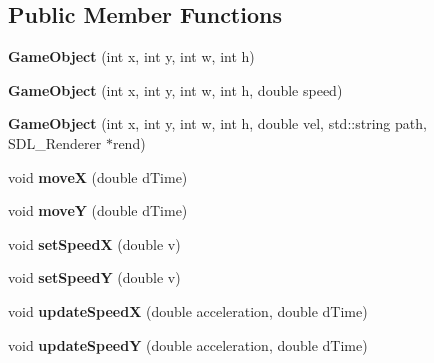\subsection*{Public Member Functions}
\begin{DoxyCompactItemize}
\item 
\hypertarget{class_game_object_ad5223d5e6c6bc39529c85dceb1d50930}{}{\bfseries Game\+Object} (int x, int y, int w, int h)\label{class_game_object_ad5223d5e6c6bc39529c85dceb1d50930}

\item 
\hypertarget{class_game_object_a3a91505bf2480eab8333df4c9c6b5a7e}{}{\bfseries Game\+Object} (int x, int y, int w, int h, double speed)\label{class_game_object_a3a91505bf2480eab8333df4c9c6b5a7e}

\item 
\hypertarget{class_game_object_a36a5f15c226732b4ecea0cd01d6c0c37}{}{\bfseries Game\+Object} (int x, int y, int w, int h, double vel, std\+::string path, S\+D\+L\+\_\+\+Renderer $\ast$rend)\label{class_game_object_a36a5f15c226732b4ecea0cd01d6c0c37}

\item 
\hypertarget{class_game_object_a508ffb146e68ae0699c16e7e0be395cf}{}void {\bfseries move\+X} (double d\+Time)\label{class_game_object_a508ffb146e68ae0699c16e7e0be395cf}

\item 
\hypertarget{class_game_object_a8c98efc0e75c4df16d6d065dbf119f4a}{}void {\bfseries move\+Y} (double d\+Time)\label{class_game_object_a8c98efc0e75c4df16d6d065dbf119f4a}

\item 
\hypertarget{class_game_object_a29a1e18b85acfbdccca5388b6b11d6e6}{}void {\bfseries set\+Speed\+X} (double v)\label{class_game_object_a29a1e18b85acfbdccca5388b6b11d6e6}

\item 
\hypertarget{class_game_object_a11263a87aad0ff22157eaf48d9e603e3}{}void {\bfseries set\+Speed\+Y} (double v)\label{class_game_object_a11263a87aad0ff22157eaf48d9e603e3}

\item 
\hypertarget{class_game_object_ac3c1034c2b4645b10a57198516f0c66e}{}void {\bfseries update\+Speed\+X} (double acceleration, double d\+Time)\label{class_game_object_ac3c1034c2b4645b10a57198516f0c66e}

\item 
\hypertarget{class_game_object_a76a96005333af8f0b2d7c6dbe1ecbeaf}{}void {\bfseries update\+Speed\+Y} (double acceleration, double d\+Time)\label{class_game_object_a76a96005333af8f0b2d7c6dbe1ecbeaf}


\end{DoxyCompactItemize}
